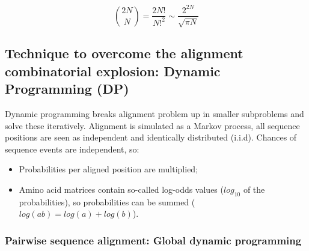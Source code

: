 \begin{equation}
\binom{2N}{N} = \frac{2N!}{{N!}^2} \sim \frac{2^{2N}}{\sqrt{\pi N}}
\end{equation}

\subsection{Technique to overcome the alignment combinatorial explosion: Dynamic Programming (DP)}

Dynamic programming breaks alignment problem up in smaller subproblems and
solve these iteratively. Alignment is simulated as a Markov process, all
sequence positions are seen as independent and identically distributed (i.i.d).
Chances of sequence events are independent, so:

\begin{itemize}
\item Probabilities per aligned position are multiplied;
\item Amino acid matrices contain so-called log-odds values ($log_{10}$ of the
probabilities), so probabilities can be summed ($log(ab)=log(a)+log(b)$).
\end{itemize}

\subsubsection{Pairwise sequence alignment: Global dynamic programming}
